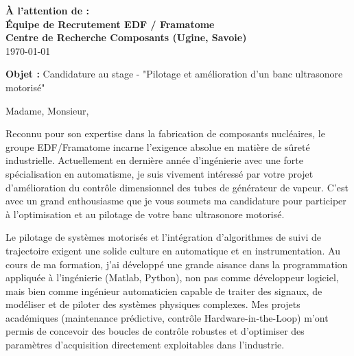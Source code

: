 \documentclass[10pt,a4paper]{altacv}
\makeatletter
\renewcommand{\makecvheader}{%
  \begingroup
    \raggedright\color{emphasis}%
    {\Huge\bfseries\MakeUppercase{\@name}\par}
    \medskip
    {\large\bfseries\color{accent}\@tagline\par}
    \medskip
    {\footnotesize\bfseries\@personalinfo\par}
  \endgroup\medskip
}
\makeatother
\begin{document}

\makecvheader

\bigskip

\begin{flushright}
  {\color{emphasis}\textbf{À l'attention de :}} \\[2pt]
  \textbf{Équipe de Recrutement EDF / Framatome} \\
  \textbf{Centre de Recherche Composants (Ugine, Savoie)} \\[20pt]
  \today
\end{flushright}
\bigskip

\bigskip

{\color{accent}\textbf{Objet :}} Candidature au stage - "Pilotage et amélioration d'un banc ultrasonore motorisé"

\bigskip\bigskip

Madame, Monsieur,

\vspace{0.4cm}

Reconnu pour son expertise dans la fabrication de composants nucléaires, le groupe EDF/Framatome incarne l'exigence absolue en matière de sûreté industrielle. Actuellement en dernière année d'ingénierie avec une forte spécialisation en automatisme, je suis vivement intéressé par votre projet d'amélioration du contrôle dimensionnel des tubes de générateur de vapeur. C'est avec un grand enthousiasme que je vous soumets ma candidature pour participer à l'optimisation et au pilotage de votre banc ultrasonore motorisé.

\vspace{0.4cm}

Le pilotage de systèmes motorisés et l'intégration d'algorithmes de suivi de trajectoire exigent une solide culture en automatique et en instrumentation. Au cours de ma formation, j'ai développé une grande aisance dans la programmation appliquée à l'ingénierie (Matlab, Python), non pas comme développeur logiciel, mais bien comme ingénieur automaticien capable de traiter des signaux, de modéliser et de piloter des systèmes physiques complexes. Mes projets académiques (maintenance prédictive, contrôle Hardware-in-the-Loop) m'ont permis de concevoir des boucles de contrôle robustes et d'optimiser des paramètres d'acquisition directement exploitables dans l'industrie.
\end{document}
